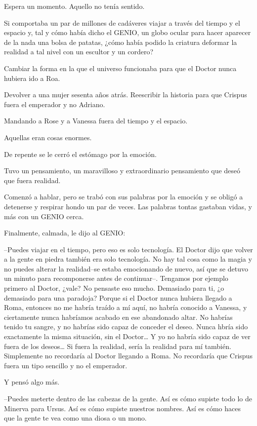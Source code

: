 Espera un momento. Aquello no tenía sentido.

Si comportaba un par de millones de cadáveres viajar a través del tiempo
y el espacio y, tal y cómo había dicho el GENIO, un globo ocular para
hacer aparecer de la nada una bolsa de patatas, ¿cómo había podido la
criatura deformar la realidad a tal nivel con un escultor y un cordero?

Cambiar la forma en la que el universo funcionaba para que el Doctor
nunca hubiera ido a Roa.

Devolver a una mujer sesenta años atrás. Reescribir la historia para que
Crispus fuera el emperador y no Adriano.

Mandando a Rose y a Vanessa fuera del tiempo y el espacio.

Aquellas eran cosas enormes.

De repente se le cerró el estómago por la emoción.

Tuvo un pensamiento, un maravilloso y extraordinario pensamiento que
deseó que fuera realidad.

Comenzó a hablar, pero se trabó con sus palabras por la emoción y se
obligó a detenerse y respirar hondo un par de veces. Las palabras tontas
gastaban vidas, y más con un GENIO cerca.

Finalmente, calmada, le dijo al GENIO:

--Puedes viajar en el tiempo, pero eso es solo tecnología. El Doctor
dijo que volver a la gente en piedra también era solo tecnología. No hay
tal cosa como la magia y no puedes alterar la realidad--se estaba
emocionando de nuevo, así que se detuvo un minuto para recomponerse
antes de continuar--. Tengamos por ejemplo primero al Doctor, ¿vale? No
pensaste eso mucho. Demasiado para ti, ¿o demasiado para una paradoja?
Porque si el Doctor nunca hubiera llegado a Roma, entonces no me habría
traído a mí aquí, no habría conocido a Vanessa, y ciertamente nunca
habríamos acabado en ese abandonado altar. No habrías tenido tu sangre,
y no habrías sido capaz de conceder el deseo. Nunca hbría sido
exactamente la misma situación, sin el Doctor\ldots{} Y yo no habría
sido capaz de ver fuera de los deseos\ldots{} Si fuera la realidad,
sería la realidad para mí también. Simplemente no recordaría al Doctor
llegando a Roma. No recordaría que Crispus fuera un tipo sencillo y no
el emperador.

Y pensó algo más.

--Puedes meterte dentro de las cabezas de la gente. Así es cómo supiste
todo lo de Minerva para Ursus. Así es cómo supiste nuestros nombres. Así
es cómo haces que la gente te vea como una diosa o un mono.

